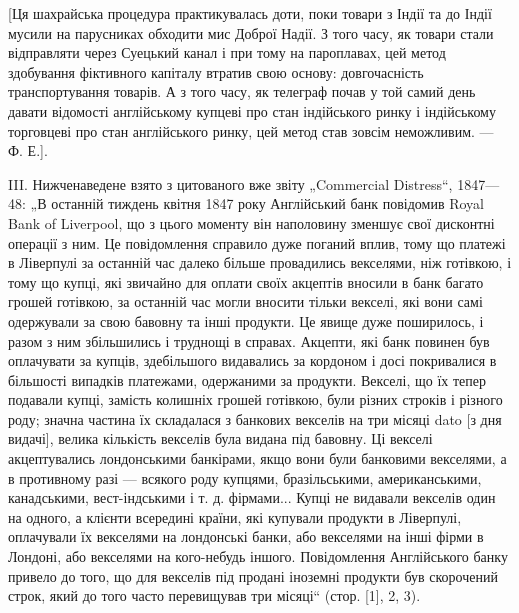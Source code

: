 
[Ця шахрайська процедура практикувалась доти, поки товари з Індії та до
Індії мусили на парусниках обходити мис Доброї Надії. З того часу, як товари
стали відправляти через Суецький канал і при тому на пароплавах, цей метод
здобування фіктивного капіталу втратив свою основу: довгочасність транспортування товарів. А з того
часу, як телеграф почав у той самий день давати відомості англійському купцеві про стан індійського
ринку і індійському торговцеві про стан англійського ринку, цей метод став зовсім неможливим. — Ф.
Е.].

III. Нижченаведене взято з цитованого вже звіту „Commercial Distress“,
1847—48: „В останній тиждень квітня 1847 року Англійський банк повідомив
Royal Bank of Liverpool, що з цього моменту він наполовину зменшує свої дисконтні операції з ним. Це
повідомлення справило дуже поганий вплив, тому
що платежі в Ліверпулі за останній час далеко більше провадились векселями,
ніж готівкою, і тому що купці, які звичайно для оплати своїх акцептів вносили
в банк багато грошей готівкою, за останній час могли вносити тільки векселі,
які вони самі одержували за свою бавовну та інші продукти. Це явище дуже
поширилось, і разом з ним збільшились і труднощі в справах. Акцепти, які
банк повинен був оплачувати за купців, здебільшого видавались за кордоном
і досі покривалися в більшості випадків платежами, одержаними за продукти. Векселі, що їх тепер
подавали купці, замість колишніх грошей готівкою, були
різних строків і різного роду; значна частина їх складалася з банкових векселів на три місяці dato
[з дня видачі], велика кількість векселів була видана
під бавовну. Ці векселі акцептувались лондонськими банкірами, якщо вони були
банковими векселями, а в противному разі — всякого роду купцями, бразільськими,
американськими, канадськими, вест-індськими і т. д. фірмами... Купці не видавали векселів один на
одного, а клієнти всередині країни, які купували продукти в Ліверпулі, оплачували їх векселями на
лондонські банки, або векселями на інші фірми в Лондоні, або векселями на кого-небудь іншого.
Повідомлення Англійського банку привело до того, що для векселів під продані іноземні продукти був
скорочений строк, який до того часто перевищував три місяці“ (стор. [1], 2, 3).


